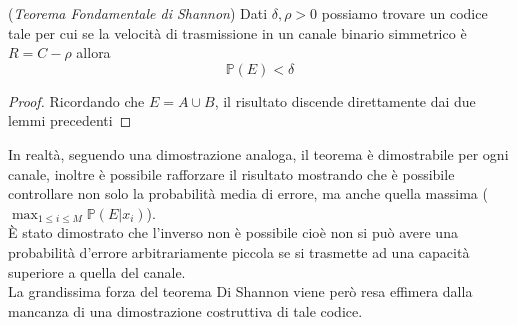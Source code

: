 \begin{teo} (\textit{Teorema Fondamentale di Shannon})
Dati $\delta , \rho > 0$ possiamo trovare un codice tale per cui se la velocità di trasmissione in un canale binario simmetrico è $R=C-\rho$ allora
$$\mathbb{P}(E)< \delta$$
\end{teo}
\begin{proof}
Ricordando che $E=A\cup B$, il risultato discende direttamente dai due lemmi precedenti
\end{proof}
In realtà, seguendo una dimostrazione analoga, il teorema è dimostrabile per ogni canale, inoltre è possibile rafforzare il risultato mostrando che è possibile controllare non solo la probabilità media di errore, ma anche quella massima ($\max_{1\leq i \leq M} \mathbb{P}(E|x_i)$).\\
È stato dimostrato che l'inverso non è possibile cioè non si può avere una probabilità d'errore arbitrariamente piccola se si trasmette ad una capacità superiore a quella del canale.\\
La grandissima forza del teorema Di Shannon viene però resa effimera dalla mancanza di una dimostrazione costruttiva di tale codice.



